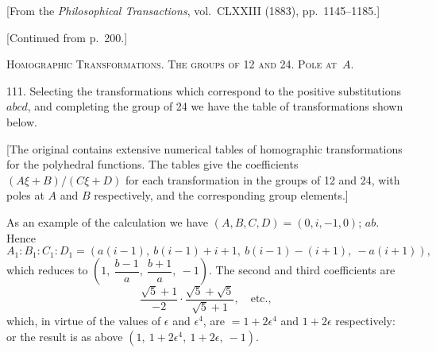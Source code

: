 \documentclass[11pt,a4paper]{book}
\begin{document}
[From the \textit{Philosophical Transactions}, vol.~CLXXIII (1883), pp.~1145--1185.]

[Continued from p.~200.]

\medskip

\noindent\textsc{Homographic Transformations. The groups of 12 and 24. Pole at~$A$.}

111. Selecting the transformations which correspond to the positive substitutions $abcd$, and completing the group of 24 we have the table of transformations shown below.

[The original contains extensive numerical tables of homographic transformations for the polyhedral functions. The tables give the coefficients $(A\xi + B)/(C\xi + D)$ for each transformation in the groups of 12 and 24, with poles at $A$ and $B$ respectively, and the corresponding group elements.]

As an example of the calculation we have $(A, B, C, D) = (0, i, -1, 0)$; $ab$. Hence
\[
A_1 : B_1 : C_1 : D_1 = (a(i-1),\ b(i-1)+i+1,\ b(i-1)-(i+1),\ -a(i+1)),
\]
which reduces to $(1,\ \dfrac{b-1}{a},\ \dfrac{b+1}{a},\ -1)$. The second and third coefficients are
\[
\frac{\sqrt{5}+1}{-2} \cdot \frac{\sqrt{5}+\sqrt{5}}{\sqrt{5}+1}, \quad \text{etc.},
\]
which, in virtue of the values of $\epsilon$ and $\epsilon^4$, are $= 1+2\epsilon^4$ and $1+2\epsilon$ respectively: or the result is as above $(1,\ 1+2\epsilon^4,\ 1+2\epsilon,\ -1)$.

\medskip
\end{document}
